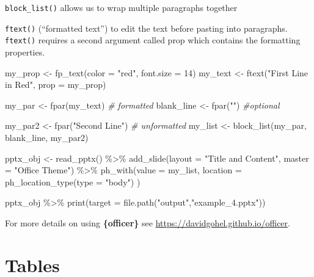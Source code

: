 \documentclass[
]{book}
\newenvironment{Shaded}{\begin{snugshade}}{\end{snugshade}}
\newcommand{\AttributeTok}[1]{\textcolor[rgb]{0.77,0.63,0.00}{#1}}
\newcommand{\CommentTok}[1]{\textcolor[rgb]{0.56,0.35,0.01}{\textit{#1}}}
\newcommand{\DecValTok}[1]{\textcolor[rgb]{0.00,0.00,0.81}{#1}}
\newcommand{\FunctionTok}[1]{\textcolor[rgb]{0.00,0.00,0.00}{#1}}
\newcommand{\NormalTok}[1]{#1}
\newcommand{\OtherTok}[1]{\textcolor[rgb]{0.56,0.35,0.01}{#1}}
\newcommand{\SpecialCharTok}[1]{\textcolor[rgb]{0.00,0.00,0.00}{#1}}
\newcommand{\StringTok}[1]{\textcolor[rgb]{0.31,0.60,0.02}{#1}}
\begin{document}
\texttt{block\_list()} allows us to wrap multiple paragraphs together

\texttt{ftext()} (``formatted text'') to edit the text before pasting into paragraphs. \texttt{ftext()} requires a second argument called prop which contains the formatting properties.

\begin{Shaded}
\begin{Highlighting}[]
\NormalTok{my\_prop }\OtherTok{\textless{}{-}} \FunctionTok{fp\_text}\NormalTok{(}\AttributeTok{color =} \StringTok{"red"}\NormalTok{, }\AttributeTok{font.size =} \DecValTok{14}\NormalTok{)}
\NormalTok{my\_text }\OtherTok{\textless{}{-}} \FunctionTok{ftext}\NormalTok{(}\StringTok{"First Line in Red"}\NormalTok{, }\AttributeTok{prop =}\NormalTok{ my\_prop)}

\NormalTok{my\_par }\OtherTok{\textless{}{-}} \FunctionTok{fpar}\NormalTok{(my\_text) }\CommentTok{\# formatted}
\NormalTok{blank\_line }\OtherTok{\textless{}{-}} \FunctionTok{fpar}\NormalTok{(}\StringTok{""}\NormalTok{) }\CommentTok{\#optional}

\NormalTok{my\_par2 }\OtherTok{\textless{}{-}} \FunctionTok{fpar}\NormalTok{(}\StringTok{"Second Line"}\NormalTok{) }\CommentTok{\# unformatted}
\NormalTok{my\_list }\OtherTok{\textless{}{-}} \FunctionTok{block\_list}\NormalTok{(my\_par, blank\_line, my\_par2)}

\NormalTok{pptx\_obj }\OtherTok{\textless{}{-}} \FunctionTok{read\_pptx}\NormalTok{() }\SpecialCharTok{\%\textgreater{}\%}
  \FunctionTok{add\_slide}\NormalTok{(}\AttributeTok{layout =} \StringTok{"Title and Content"}\NormalTok{, }\AttributeTok{master =} \StringTok{"Office Theme"}\NormalTok{) }\SpecialCharTok{\%\textgreater{}\%} 
  \FunctionTok{ph\_with}\NormalTok{(}\AttributeTok{value =}\NormalTok{ my\_list, }\AttributeTok{location =} \FunctionTok{ph\_location\_type}\NormalTok{(}\AttributeTok{type =} \StringTok{"body"}\NormalTok{) )}

\NormalTok{pptx\_obj }\SpecialCharTok{\%\textgreater{}\%}
  \FunctionTok{print}\NormalTok{(}\AttributeTok{target =} \FunctionTok{file.path}\NormalTok{(}\StringTok{"output"}\NormalTok{,}\StringTok{"example\_4.pptx"}\NormalTok{))}
\end{Highlighting}
\end{Shaded}

For more details on using \textbf{\{officer\}} see \url{https://davidgohel.github.io/officer}.

\hypertarget{tables}{%
\section{Tables}\label{tables}}
\end{document}
